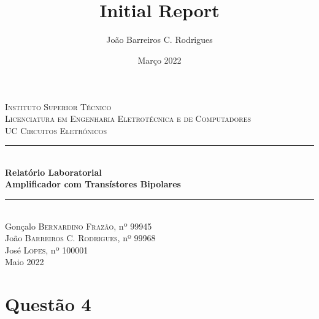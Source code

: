 \documentclass[a4paper,12pt]{article}
\date{Março 2022}
\title{ \\ \large {Initial Report}}
\author{João Barreiros C. Rodrigues}
\begin{document}
        \begin{titlepage} %
        	\newcommand{\HRule}{\rule{\linewidth}{0.5mm}} %
        	\center %
        	\textsc{\LARGE Instituto Superior Técnico}\\[1.5cm] %
        	\textsc{\Large Licenciatura em Engenharia Eletrotécnica e de Computadores}\\[0.25cm]
		\textsc{\Large UC Circuitos Eletrónicos}\\[0.25cm]
        	\HRule\\[0.4cm]
        	{\LARGE\bfseries Relatório Laboratorial}\\[0.4cm] %
        	{\huge\bfseries Amplificador com Transístores Bipolares}\\[0.4cm] %
        	\HRule\\[1.5cm]
		Gonçalo \textsc{Bernardino Frazão}, nº 99945 \\
        	João \textsc{Barreiros C. Rodrigues}, nº 99968\\
		José \textsc{Lopes}, nº 100001\\ 
        	\vfill\vfill\vfill %
        	{\large Maio 2022} %
        	\vfill %
	\end{titlepage}
        \newpage
        	\tableofcontents
        \clearpage
		\section{Questão 4}
\end{document}

